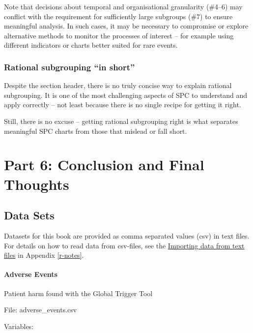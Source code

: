 \documentclass[
]{book}
\begin{document}
Note that decisions about temporal and organisational granularity (\#4--6) may conflict with the requirement for sufficiently large subgroups (\#7) to ensure meaningful analysis. In such cases, it may be necessary to compromise or explore alternative methods to monitor the processes of interest -- for example using different indicators or charts better suited for rare events.

\section{Rational subgrouping ``in short''}\label{rational-subgrouping-in-short}

Despite the section header, there is no truly concise way to explain rational subgrouping. It is one of the most challenging aspects of SPC to understand and apply correctly -- not least because there is no single recipe for getting it right.

Still, there is no excuse -- getting rational subgrouping right is what separates meaningful SPC charts from those that mislead or fall short.

\part*{Part 6: Conclusion and Final Thoughts}\label{part-part-6-conclusion-and-final-thoughts}

\appendix


\chapter{Data Sets}\label{data-sets}

Datasets for this book are provided as comma separated values (csv) in text files. For details on how to read data from csv-files, see the \hyperref[importing-data-from-text-files]{Importing data from text files} in Appendix \ref{r-notes}.

\subsection*{Adverse Events}\label{adverse-events}

Patient harm found with the Global Trigger Tool

File: adverse\_events.csv

Variables:
\end{document}

